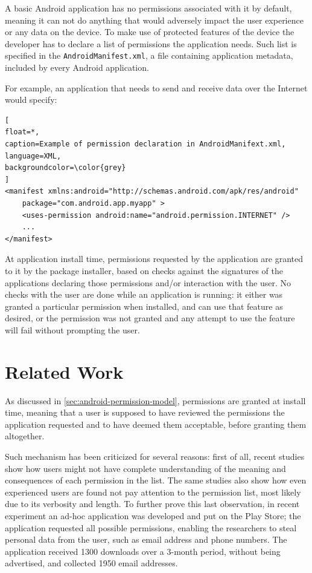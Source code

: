\documentclass[twoside,letterpaper]{soups}
\theoremstyle{definition}
\begin{document}
A basic Android application has no permissions associated with it by default, meaning it can not do anything that would adversely impact the user experience or any data on the device. To make use of protected features of the device the developer has to declare a list of permissions the application needs. Such list is specified in the \texttt{AndroidManifest.xml}, a file containing application metadata, included by every Android application.

For example, an application that needs to send and receive data over the Internet would specify:

\begin{lstlisting}[
float=*,
caption=Example of permission declaration in AndroidManifext.xml,
language=XML,
backgroundcolor=\color{grey}
]
<manifest xmlns:android="http://schemas.android.com/apk/res/android"
    package="com.android.app.myapp" >
    <uses-permission android:name="android.permission.INTERNET" />
    ...
</manifest>
\end{lstlisting}

At application install time, permissions requested by the application are granted to it by the package installer, based on checks against the signatures of the applications declaring those permissions and/or interaction with the user.
No checks with the user are done while an application is running: it either was granted a particular permission when installed, and can use that feature as desired, or the permission was not granted and any attempt to use the feature will fail without prompting the user.

\section{Related Work}
As discussed in \autoref{sec:android-permission-model}, permissions are granted at install time, meaning that a user is supposed to have reviewed the permissions the application requested and to have deemed them acceptable, before granting them altogether.

Such mechanism has been criticized for several reasons: first of all, recent studies \cite{Felt:2012:APU:2335356.2335360} \cite{Kelley:2012:CPI:2426020.2426027} show how users might not have complete understanding of the meaning and consequences of each permission in the list. The same studies also show how even experienced users are found not pay attention to the permission list, most likely due to its verbosity and length. To further prove this last observation, in recent experiment \cite{stickley} an ad-hoc application was developed and put on the Play Store; the application requested all possible permissions, enabling the researchers to steal personal data from the user, such as email address and phone numbers. The application received 1300 downloads over a 3-month period, without being advertised, and collected 1950 email addresses.
\end{document}
